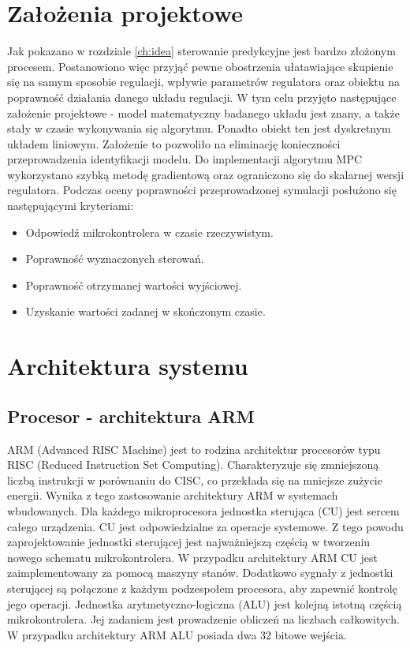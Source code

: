 \section{Założenia projektowe} \label{sec:assumptions}
Jak pokazano w rozdziale \ref{ch:idea} sterowanie predykcyjne jest bardzo złożonym procesem.
Postanowiono więc przyjąć pewne obostrzenia ułatawiające skupienie się na samym sposobie regulacji, 
wpływie parametrów regulatora oraz obiektu na poprawność działania danego układu regulacji. W tym
celu przyjęto następujące założenie projektowe - model matematyczny badanego układu jest znany, a
także stały w czasie wykonywania się algorytmu. Ponadto obiekt ten jest dyskretnym układem liniowym.
Założenie to pozwoliło na eliminację konieczności przeprowadzenia identyfikacji modelu. Do
implementacji algorytmu MPC wykorzystano szybką metodę gradientową oraz ograniczono się do skalarnej
wersji regulatora.
Podczas oceny poprawności przeprowadzonej symulacji posłużono się następującymi kryteriami:  
\begin{itemize}
	\item Odpowiedź mikrokontrolera w czasie rzeczywistym.
    \item Poprawność wyznaczonych sterowań.
    \item Poprawność otrzymanej wartości wyjściowej.
    \item Uzyskanie wartości zadanej w skończonym czasie.
\end{itemize}

\section{Architektura systemu} \label{sec:system}

\subsection{Procesor - architektura ARM} \label{sec:arm}
ARM (Advanced RISC Machine) jest to rodzina architektur procesorów typu RISC (Reduced Instruction
Set Computing). Charakteryzuje się zmniejszoną liczbą instrukcji w porównaniu do CISC, co
przekłada się na mniejsze zużycie energii. Wynika z tego zastosowanie architektury ARM
w systemach wbudowanych. Dla każdego mikroprocesora jednostka sterująca (CU) jest sercem całego
urządzenia. CU jest odpowiedzialne za operacje systemowe. Z tego powodu zaprojektowanie jednostki
sterującej jest najważniejszą częścią w tworzeniu nowego schematu mikrokontrolera. W przypadku
architektury ARM CU jest zaimplementowany za pomocą maszyny stanów. Dodatkowo sygnały z jednostki
sterującej są połączone z każdym podzespołem procesora, aby zapewnić kontrolę jego operacji.
Jednostka arytmetyczno-logiczna (ALU) jest kolejną istotną częścią mikrokontrolera. Jej zadaniem
jest prowadzenie obliczeń na liczbach całkowitych. W przypadku architektury ARM ALU posiada dwa
32 bitowe wejścia.  


